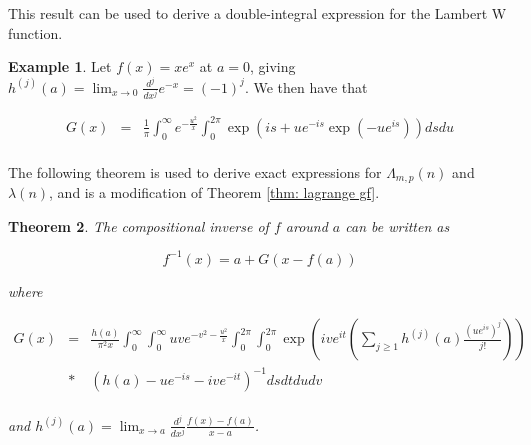 \documentclass[12pt]{article}
\theoremstyle{plain}
\newtheorem{thm}{Theorem}
\theoremstyle{definition}
\newtheorem{eg}[thm]{Example}
\theoremstyle{remark}
\theoremstyle{definition}
\begin{document}
This result can be used to derive a double-integral expression for the Lambert W function.

\begin{eg}
Let $f(x)=xe^x$ at $a=0$, giving $h^{(j)}(a) = \lim_{x \to 0}\frac{d^j}{dx^j}e^{-x} = (-1)^{j}$. We then have that 

\begin{eqnarray*}
    G(x)& = & \frac{1}{\pi} \int_0^\infty e^{-\frac{u^2}{x}} \int_0^{2\pi} \exp(is + ue^{-is}\exp(-ue^{is}))ds du \\
\end{eqnarray*}


\end{eg}

The following theorem is used to derive exact expressions for $\Lambda_{m,p}(n)$ and $\lambda(n)$, and is a modification of Theorem \ref{thm: lagrange gf}.

\begin{thm}\label{thm: lagrange gf 2}
The compositional inverse of $f$ around $a$ can be written as 

\begin{equation}
    f^{-1}(x) = a + G(x-f(a))    
\end{equation}

where 

\begin{eqnarray*}
    G(x)& = & \frac{h(a)}{\pi^2 x} \int_0^\infty\int_0^\infty uve^{-v^2-\frac{u^2}{x}}\int_0^{2\pi}\int_0^{2\pi} \exp\left(ive^{it}\left(\sum_{j \geq 1}h^{(j)}(a) \frac{(ue^{is})^j}{j!}\right)\right) \\
    & * & \left(h(a)-ue^{-is}-ive^{-it}\right)^{-1} ds dt du dv\\
\end{eqnarray*}

and $h^{(j)}(a) = \lim_{x \to a}\frac{d^{j}}{dx^{j}}\frac{f(x)-f(a)}{x-a}$.

\end{thm}
\end{document}
